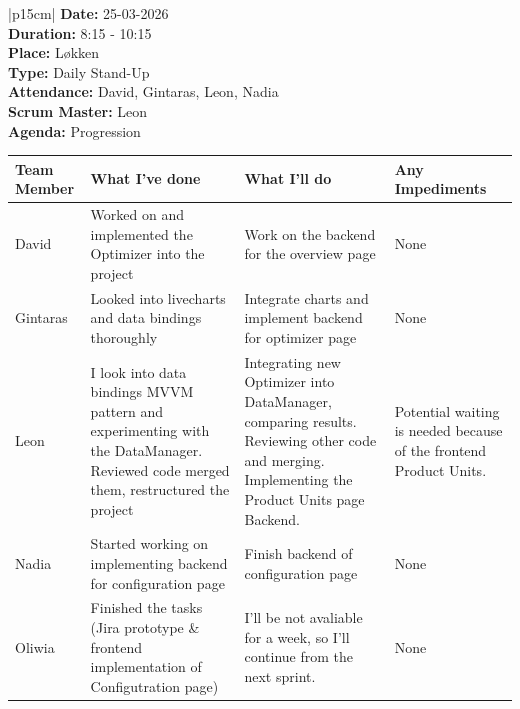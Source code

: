 \begin{table}[H]
    \centering
    \begin{tabular}{|p{15cm}|}   
        \hline
        \textbf{Date:}  25-03-2026 \\
        \textbf{Duration:} 8:15 - 10:15 \\
        \textbf{Place:}  Løkken \\
        \textbf{Type:} Daily Stand-Up \\
        \textbf{Attendance:}  David, Gintaras, Leon, Nadia\\
        \textbf{Scrum Master:}  Leon \\
        \textbf{Agenda:} Progression
        \begin{table}[H]
            \begin{tabular}{|p{1.75cm}|p{4cm}|p{4cm}|p{4cm}|}
                \hline
                \cellcolor[HTML]{BFBFBF}  \textbf{Team Member} & \cellcolor[HTML]{BFBFBF}  \textbf{What I've done} & \cellcolor[HTML]{BFBFBF}  \textbf{What I'll do} & \cellcolor[HTML]{BFBFBF}  \textbf{Any Impediments}\\
                \hline
                \cellcolor[HTML]{d4d4d4} David & Worked on and implemented the Optimizer into the project & Work on the backend for the overview page & None \\
                \hline
                \cellcolor[HTML]{d4d4d4} Gintaras & Looked into livecharts and data bindings thoroughly & Integrate charts and implement backend for optimizer page & None \\
                \hline
                \cellcolor[HTML]{d4d4d4} Leon & I look into data bindings MVVM pattern and experimenting with the DataManager. Reviewed code merged them, restructured the project & Integrating new Optimizer into DataManager, comparing results. Reviewing other code and merging. Implementing the Product Units page Backend. & Potential waiting is needed because of the frontend Product Units. \\
                \hline
                \cellcolor[HTML]{d4d4d4} Nadia & Started working on implementing backend for configuration page & Finish backend of configuration page & None \\
                \hline
                \cellcolor[HTML]{d4d4d4} Oliwia & Finished the tasks (Jira prototype \& frontend implementation of Configutration page) & I'll be not avaliable for a week, so I'll continue from the next sprint. & None \\
                \hline
            \end{tabular}
        \end{table}
        \\
        \hline
    \end{tabular}
\end{table}

